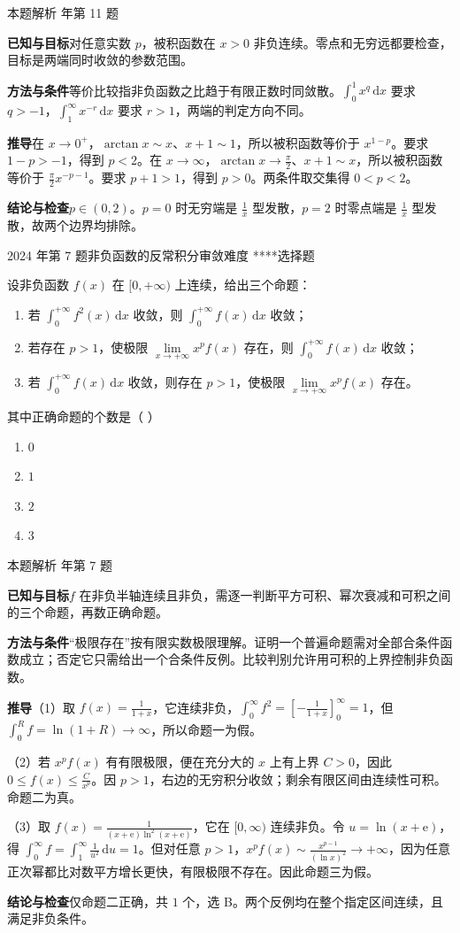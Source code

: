 \documentclass[UTF8,zihao=-4,fontset=fandol]{ctexart}
\renewcommand{\lim}{\operatorname*{lim}\limits}
\newenvironment{abcd}{\begin{enumerate}[label=\textup{(\Alph*)},leftmargin=2.3em,itemsep=1pt,topsep=4pt,parsep=1pt]}{\end{enumerate}}
\newcommand{\choices}[4]{%
  \begin{abcd}
    \item #1
    \item #2
    \item #3
    \item #4
  \end{abcd}}
\newcounter{BankQuestion}
\newcommand{\QuestionPage}[7]{%
  \stepcounter{BankQuestion}%
  \par\noindent\begin{minipage}{\linewidth}
  \raggedright
  {\small\textcolor{black!60}{#3\quad #5\quad 难度 #7}\hfill\textcolor{accent}{#2}}\par\smallskip}
\newcommand{\QuestionEnd}{\end{minipage}\par\medskip}
\newcommand{\QuestionPage}[7]{%
  \clearpage
  \stepcounter{BankQuestion}%
  {\small\textcolor{accent}{#1\hfill #2}}\par\medskip
  {\small\textcolor{black!60}{#3\quad #5\quad 难度 #7\hfill \arabic{BankQuestion} / 234}}\par\vspace{9bp}}
\newcommand{\QuestionEnd}{}
\newenvironment{QuestionSolution}[1]{%
  \clearpage
  {\small\textcolor{black!60}{本题解析\quad #1}}\par\medskip
}{\par\clearpage}
\begin{document}
\begin{QuestionSolution}{2026 年第 11 题}
\textbf{已知与目标}\quad 对任意实数 \(p\)，被积函数在 \(x>0\) 非负连续。零点和无穷远都要检查，目标是两端同时收敛的参数范围。

\textbf{方法与条件}\quad 等价比较指非负函数之比趋于有限正数时同敛散。\(\int_0^1x^q\,\mathrm{d}x\) 要求 \(q>-1\)，\(\int_1^\infty x^{-r}\,\mathrm{d}x\) 要求 \(r>1\)，两端的判定方向不同。

\textbf{推导}\quad 在 \(x\to0^+\)，\(\arctan x\sim x\)、\(x+1\sim1\)，所以被积函数等价于 \(x^{1-p}\)。要求 \(1-p>-1\)，得到 \(p<2\)。在 \(x\to\infty\)，\(\arctan x\to\frac{\pi}{2}\)、\(x+1\sim x\)，所以被积函数等价于 \(\frac{\pi}{2}x^{-p-1}\)。要求 \(p+1>1\)，得到 \(p>0\)。两条件取交集得 \(0<p<2\)。

\textbf{结论与检查}\quad \(\boxed{p\in(0,2)}\)。\(p=0\) 时无穷端是 \(\frac{1}{x}\) 型发散，\(p=2\) 时零点端是 \(\frac{1}{x}\) 型发散，故两个边界均排除。
\end{QuestionSolution}

\QuestionPage{3.5 反常积分}{选择题}{2024 年第 7 题}{1}{非负函数的反常积分审敛}{195 / 234}{****}
设非负函数 \(f(x)\) 在 \([0,+\infty)\) 上连续，给出三个命题：
\begin{enumerate}
\item 若 \(\int_0^{+\infty}f^2(x)\,\mathrm{d}x\) 收敛，则 \(\int_0^{+\infty}f(x)\,\mathrm{d}x\) 收敛；
\item 若存在 \(p>1\)，使极限 \(\lim_{x\to+\infty}x^p f(x)\) 存在，则 \(\int_0^{+\infty}f(x)\,\mathrm{d}x\) 收敛；
\item 若 \(\int_0^{+\infty}f(x)\,\mathrm{d}x\) 收敛，则存在 \(p>1\)，使极限 \(\lim_{x\to+\infty}x^p f(x)\) 存在。
\end{enumerate}
其中正确命题的个数是（ ）
\choices{\(0\)}{\(1\)}{\(2\)}{\(3\)}
\QuestionEnd

\begin{QuestionSolution}{2024 年第 7 题}
\textbf{已知与目标}\quad \(f\) 在非负半轴连续且非负，需逐一判断平方可积、幂次衰减和可积之间的三个命题，再数正确命题。

\textbf{方法与条件}\quad “极限存在”按有限实数极限理解。证明一个普遍命题需对全部合条件函数成立；否定它只需给出一个合条件反例。比较判别允许用可积的上界控制非负函数。

\textbf{推导}\quad （1）取 \(f(x)=\frac{1}{1+x}\)，它连续非负，\(\int_0^\infty f^2=\left[-\frac{1}{1+x}\right]_0^\infty=1\)，但 \(\int_0^R f=\ln(1+R)\to\infty\)，所以命题一为假。

（2）若 \(x^pf(x)\) 有有限极限，便在充分大的 \(x\) 上有上界 \(C>0\)，因此 \(0\le f(x)\le\frac{C}{x^p}\)。因 \(p>1\)，右边的无穷积分收敛；剩余有限区间由连续性可积。命题二为真。

（3）取 \(f(x)=\frac{1}{(x+\mathrm{e})\ln^2(x+\mathrm{e})}\)，它在 \([0,\infty)\) 连续非负。令 \(u=\ln(x+\mathrm{e})\)，得 \(\int_0^\infty f=\int_1^\infty\frac{1}{u^2}\,\mathrm{d}u=1\)。但对任意 \(p>1\)，\(x^pf(x)\sim\frac{x^{p-1}}{(\ln x)^2}\to+\infty\)，因为任意正次幂都比对数平方增长更快，有限极限不存在。因此命题三为假。

\textbf{结论与检查}\quad 仅命题二正确，共 \(\boxed{1}\) 个，选 B。两个反例均在整个指定区间连续，且满足非负条件。
\end{QuestionSolution}
\end{document}
